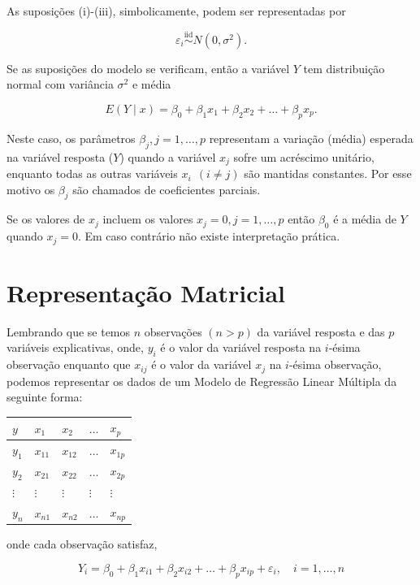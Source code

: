 \documentclass[
]{book}
\begin{document}
As suposições (i)-(iii), simbolicamente, podem ser representadas por

\[\varepsilon_{i} {\stackrel{\mbox{iid}}{\sim}}N(0, \sigma^2).\]

Se as suposições do modelo se verificam, então a variável \(Y\) tem distribuição normal com variância \(\sigma^2\) e média

\[E(Y\mid x)=\beta_0+\beta_1 x_{1}+\beta_2 x_{2}+\ldots+\beta_p x_{p}.\]

Neste caso, os parâmetros \(\beta_j,j=1,\dots,p\) representam a variação (média) esperada na variável resposta (\(Y\)) quando a variável \(x_j\) sofre um acréscimo unitário, enquanto todas as outras variáveis \(x_i~~(i\neq j)\) são mantidas constantes. Por esse motivo os \(\beta_j\) são chamados de coeficientes parciais.

Se os valores de \(x_j\) incluem os valores \(x_j=0,j=1,\dots,p\) então \(\beta_0\) é a média de \(Y\) quando \(x_j=0.\) Em caso contrário não existe interpretação prática.

\hypertarget{representauxe7uxe3o-matricial}{%
\section{Representação Matricial}\label{representauxe7uxe3o-matricial}}

Lembrando que se temos \(n\) observações \((n > p)\) da variável resposta e das \(p\) variáveis explicativas, onde, \(y_i\) é o valor da variável resposta na \(i\)-ésima observação enquanto que \(x_{ij}\) é o valor da variável \(x_j\) na \(i\)-ésima observação, podemos representar os dados de um Modelo de Regressão Linear Múltipla da seguinte forma:

\begin{longtable}[]{@{}lllll@{}}
\toprule
\(y\) & \(x_1\) & \(x_2\) & \(\ldots\) & \(x_p\) \\
\midrule
\endhead
\(y_1\) & \(x_{11}\) & \(x_{12}\) & \(\ldots\) & \(x_{1p}\) \\
\(y_2\) & \(x_{21}\) & \(x_{22}\) & \(\ldots\) & \(x_{2p}\) \\
\(\vdots\) & \(\vdots\) & \(\vdots\) & \(\vdots\) & \(\vdots\) \\
\(y_n\) & \(x_{n1}\) & \(x_{n2}\) & \(\ldots\) & \(x_{np}\) \\
\bottomrule
\end{longtable}

onde cada observação satisfaz,

\[Y_i=\beta_0 + \beta_1 x_{i1} + \beta_2 x_{i2} + \ldots + \beta_p x_{ip} + \varepsilon_i, \quad i=1,\ldots, n\]
\end{document}
